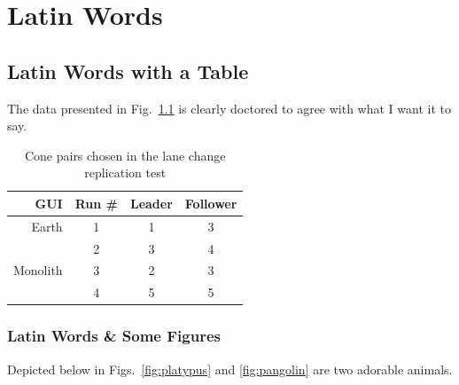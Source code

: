 \chapter{Latin Words}
\label{chap:latinwords}

\lipsum[1]



\section{Latin Words with a Table}
\label{sec:latinwords}

The data presented in Fig.~\ref{tab:lanechangeresults} is clearly doctored to agree with what I want it to say.


\begin{table}[htbp] \centering \caption{Cone pairs chosen in the lane change replication test}
\begin{tabular}{rc|cc} 
    GUI&    Run \#  &     Leader&    Follower \\ \hline\hline
    Earth&      1       &       1   &    3 \\
         &      2       &       3   &    4   \\ \hline
    Monolith&   3       &       2   &    3   \\
         &      4       &       5   &    5 \\ \hline   
\end{tabular} \label{tab:lanechangeresults} \end{table}

\lipsum[2]



\subsection{Latin Words \& Some Figures}
\label{sec:latinwordsfigs}

Depicted below in Figs.~\ref{fig:platypus} and \ref{fig:pangolin} are two adorable animals. 

